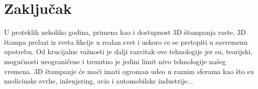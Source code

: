 \documentclass[a4paper]{article}
\begin{document}
\section{Zaključak}
\label{sec:Zaključak}

U proteklih nekoliko godina, primena kao i dostupnost 3D štampanja raste, 3D štampa prelazi iz sveta fikcije u realan svet i uskoro ce se pretopiti u savremenu upotrebu. Od krucijalne važnosti je dalji razvitak ove tehnologije jer su, teorijski, mogućnosti neograničene i trenutno je jedini limit nivo tehnologije našeg vremena. 3D štampanje će moći imati ogroman udeo u raznim sferama kao što su medicinske svrhe, inženjering, avio i automobilske industrije...
\newpage
 

% 
%











\end{document}
